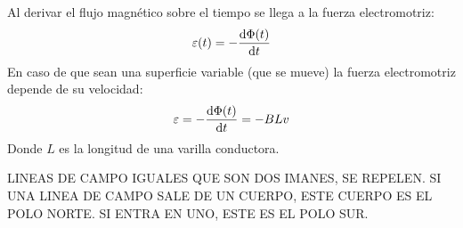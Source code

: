 \documentclass[arial,a4paper,print]{article}
\begin{document}
Al derivar el flujo magnético sobre el tiempo se llega a la fuerza electromotriz:
\begin{equation*}
	\varepsilon(t) = -\dv{\Phi(t)}{t}
\end{equation*}
En caso de que sean una superficie variable (que se mueve) la fuerza electromotriz depende de su velocidad:
\begin{equation*}
	\varepsilon = -\dv{\Phi(t)}{t} = -BLv
\end{equation*}
Donde $L$ es la longitud de una varilla conductora. 



LINEAS DE CAMPO IGUALES QUE SON DOS IMANES, SE REPELEN. SI UNA LINEA DE CAMPO SALE DE UN CUERPO, ESTE CUERPO ES EL POLO NORTE. SI ENTRA EN UNO, ESTE ES EL POLO SUR. 
\end{document}
